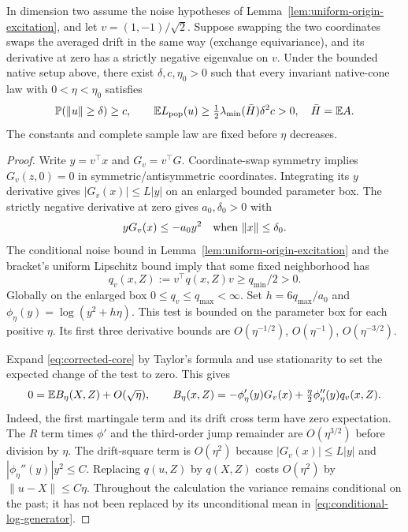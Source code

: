 \begin{proposition}
\label{prop:matrix-stationary-repulsion}
In dimension two assume the noise hypotheses of
Lemma~\ref{lem:uniform-origin-excitation}, and let $v=(1,-1)/\sqrt2$.
Suppose swapping the two coordinates swaps the averaged drift in the same
way (exchange equivariance), and its derivative at zero has a strictly negative
eigenvalue on $v$. Under the bounded native setup above, there exist
$\delta,c,\eta_0>0$ such that every invariant native-cone law with
$0<\eta<\eta_0$ satisfies
\[
 \mathbb P(\|u\|\geq\delta)\geq c,\qquad
 \mathbb E L_{\rm pop}(u)\geq
       \tfrac12\lambda_{\min}(\bar H)\delta^2c>0,
 \quad \bar H=\mathbb E A.
\]
The constants and complete sample law are fixed before $\eta$ decreases.
\end{proposition}
\begin{proof}
Write $y=v^\top x$ and $G_v=v^\top G$. Coordinate-swap symmetry implies
$G_v(z,0)=0$ in symmetric/antisymmetric coordinates. Integrating its
$y$ derivative gives $|G_v(x)|\leq L|y|$ on an enlarged bounded parameter box.
The strictly negative derivative at zero gives $a_0,\delta_0>0$ with
\[
 yG_v(x)\leq-a_0y^2\quad\hbox{when }\|x\|\leq\delta_0.
\]
The conditional noise bound in Lemma~\ref{lem:uniform-origin-excitation}
and the bracket's uniform Lipschitz bound imply that some fixed
neighborhood has
\[
 q_v(x,Z):=v^\top q(x,Z)v\geq q_{\min}/2>0.
\]
Globally on the enlarged box $0\leq q_v\leq q_{\max}<\infty$.
Set $h=6q_{\max}/a_0$ and
$\phi_\eta(y)=\log(y^2+h\eta)$. This test is bounded on the parameter
box for each positive $\eta$. Its first three derivative bounds are
$O(\eta^{-1/2})$, $O(\eta^{-1})$, $O(\eta^{-3/2})$.

Expand \eqref{eq:corrected-core} by Taylor's formula and use stationarity
to set the expected change of the test to zero. This gives
\begin{equation}\label{eq:conditional-log-generator}
 0=\mathbb E B_\eta(X,Z)+O(\sqrt\eta),\qquad
 B_\eta(x,Z)=-\phi_\eta'(y)G_v(x)
             +\tfrac\eta2\phi_\eta''(y)q_v(x,Z).
\end{equation}
Indeed, the first martingale term and its drift cross term have zero
expectation. The $R$ term times $\phi'$ and the third-order jump remainder
are $O(\eta^{3/2})$ before division by $\eta$. The drift-square term is
$O(\eta^2)$ because $|G_v(x)|\leq L|y|$ and
$|\phi_\eta''(y)|y^2\leq C$. Replacing $q(u,Z)$ by $q(X,Z)$ costs
$O(\eta^2)$ by $\|u-X\|\leq C\eta$. Throughout the calculation the variance remains conditional on the past;
it has not been replaced by its unconditional mean in
\eqref{eq:conditional-log-generator}.


\end{proof}
